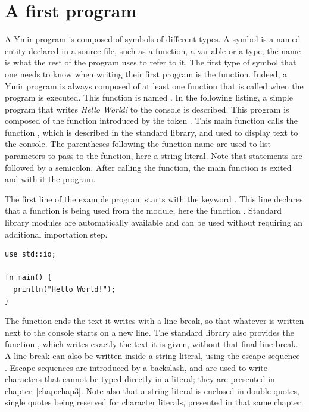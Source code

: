 \section{A first program}

A Ymir program is composed of symbols of different types. A symbol is a named
entity declared in a source file, such as a function, a variable or a type; the
name is what the rest of the program uses to refer to it. The first type of
symbol that one needs to know when writing their first program is the function.
Indeed, a Ymir program is always composed of at least one function that is
called when the program is executed. This function is named . In the
following listing, a simple program that writes \textit{Hello World!} to the
console is described. This program is composed of the function 
introduced by the token . This main function calls the function
, which is described in the standard library, and used to display
text to the console. The parentheses following the  function name
are used to list parameters to pass to the function, here a string
literal. Note that statements are followed by a semicolon. After calling the
 function, the main function is exited and with it the program.

The first line of the example program starts with the keyword . This
line declares that a function is being used from the  module,
here the function . Standard library modules are automatically
available and can be used without requiring an additional importation step.

\begin{lstlisting}[style=coloredverbatim, caption=Source file \textit{hello.yr}, label=lst:hello_world]
use std::io;

fn main() {
  println("Hello World!");
}
\end{lstlisting}

The  function ends the text it writes with a line break, so that
whatever is written next to the console starts on a new line. The standard
library also provides the function , which writes exactly the text
it is given, without that final line break. A line break can also be written
inside a string literal, using the escape sequence
. Escape sequences are introduced by a backslash,
and are used to write characters that cannot be typed directly in a literal;
they are presented in chapter~\ref{chap:chap3}. Note also that a string literal
is enclosed in double quotes, single quotes being reserved for character
literals, presented in that same chapter.

